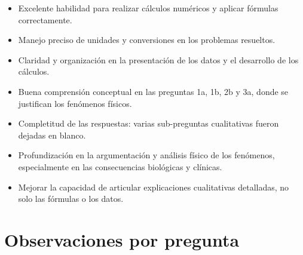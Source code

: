 \documentclass[11pt,a4paper]{article}
\begin{document}
\vspace{4pt}
\begin{minipage}[t]{0.48\linewidth}
  \begin{tcolorbox}[cajaFortaleza, title={Fortalezas}]
\begin{itemize}[leftmargin=1.5em, itemsep=2pt]
  \item Excelente habilidad para realizar cálculos numéricos y aplicar fórmulas correctamente.
  \item Manejo preciso de unidades y conversiones en los problemas resueltos.
  \item Claridad y organización en la presentación de los datos y el desarrollo de los cálculos.
  \item Buena comprensión conceptual en las preguntas 1a, 1b, 2b y 3a, donde se justifican los fenómenos físicos.
\end{itemize}
  \end{tcolorbox}
\end{minipage}
\hfill
\begin{minipage}[t]{0.48\linewidth}
  \begin{tcolorbox}[cajaMejora, title={Areas de mejora}]
\begin{itemize}[leftmargin=1.5em, itemsep=2pt]
  \item Completitud de las respuestas: varias sub-preguntas cualitativas fueron dejadas en blanco.
  \item Profundización en la argumentación y análisis físico de los fenómenos, especialmente en las consecuencias biológicas y clínicas.
  \item Mejorar la capacidad de articular explicaciones cualitativas detalladas, no solo las fórmulas o los datos.
\end{itemize}
  \end{tcolorbox}
\end{minipage}

\section*{Observaciones por pregunta}
\end{document}
